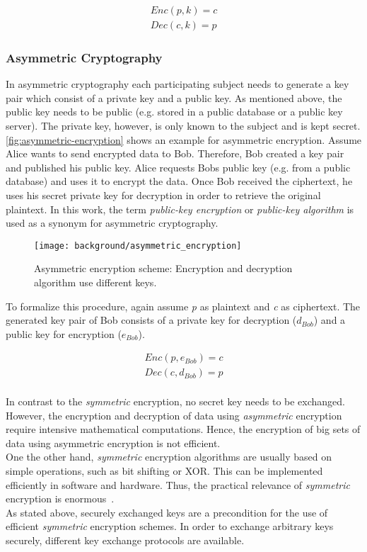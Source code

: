 \begin{align*}
Enc(p, k) = c\\
Dec(c, k) = p
\end{align*}

\subsubsection{Asymmetric Cryptography}

In asymmetric cryptography each participating subject needs to generate a key pair which consist of a private key and a public key. As mentioned above, the public key needs to be public (e.g. stored in a public database or a public key server). The private key, however, is only known to the subject and is kept secret.
\autoref{fig:asymmetric-encryption} shows an example for asymmetric encryption. Assume Alice wants to send encrypted data to Bob. Therefore, Bob created a key pair and published his public key. Alice requests Bobs public key (e.g. from a public database) and uses it to encrypt the data. Once Bob received the ciphertext, he uses his secret private key for decryption in order to retrieve the original  plaintext. In this work, the term \textit{public-key encryption} or \textit{public-key algorithm} is used as a synonym for asymmetric cryptography.

\begin{figure}[htpb]
  \centering
  \texttt{[image: background/asymmetric\_encryption]}
  \caption[Asymmetric encryption scheme]{Asymmetric encryption scheme: Encryption and decryption algorithm use different keys.} \label{fig:asymmetric-encryption}
\end{figure}
To formalize this procedure, again assume \textit{p} as plaintext and \textit{c} as ciphertext. The generated key pair of Bob consists of a private key for decryption ($d_{Bob}$) and a public key for encryption ($e_{Bob}$).

\begin{align*}
Enc(p, e_{Bob}) = c\\
Dec(c, d_{Bob}) = p
\end{align*}
\\
In contrast to the \textit{symmetric} encryption, no secret key needs to be exchanged. However, the encryption and decryption of data using \textit{asymmetric} encryption require intensive mathematical computations. Hence, the encryption of big sets of data using asymmetric encryption is not efficient.\\
One the other hand, \textit{symmetric} encryption algorithms are usually based on simple operations, such as bit shifting or XOR. This can be implemented efficiently in software and hardware. Thus, the practical relevance of \textit{symmetric} encryption is enormous~\parencite{ITSicherheit}.
\\
As stated above, securely exchanged keys are a precondition for the use of efficient \textit{symmetric} encryption schemes. In order to exchange arbitrary keys securely, different key exchange protocols are available.

